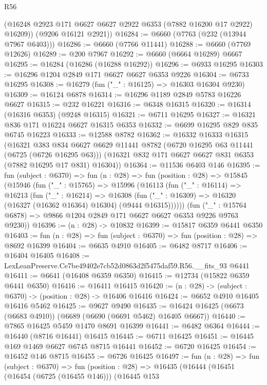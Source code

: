 \begin{lexlean}{R56}
\begin{coremodule}
        (@16248 @2923 @171 @6627 @6627 @2922 @6353 (@7882 @16200 @17 @2922) @16209))
      (@9206 @16121 @2921))
@16284 := @6660 (@7763 (@232 (@13944 @7967 @6403)))
@16286 := @6660 (@7766 @11441)
@16288 := @6660 (@7769 @12626)
@16289 := @200 @7967
@16292 := @6660 (@6664 @16289) @6667
@16295 := @16284 (@16286 (@16288 @16292))
@16296 := @6933 @16295
@16303 := @16296 @1204 @2849 @171 @6627 @6627 @6353 @9226
@16304 := @6733 @16295
@16308 := @16279 (fun ("_" : @16125) => @16303 @16304 @9230)
@16309 := @16124 @6878
@16314 := @16296 @1189 @2849 @5783 @16226 @6627
@16315 := @232 @16221
@16316 := @6348 @16315
@16320 := @16314 (@16316 @6353) (@9248 @16315)
@16321 := @6711 @16295
@16327 := @16321 @836 @171 @16224 @6627 @16315 @6353
@16332 := @6699 @16295 @829 @835 @6745 @16223
@16333 := @12588 @8782
@16362 := @16332
    @16333
    @16315
    (@16321
      @383
      @834
      @6627
      @6629
      @11441
      @8782
      (@6720 @16295 @63 @11441 (@6725 (@6726 @16295 @63)))
      (@16321 @832 @171 @6627 @6627 @831 @6353 (@7882 @16295 @17 @831) @16304))
@16364 := @11536 @6403 @146
@16395 := fun (subject : @6370) =>
  fun (n : @28) =>
  fun (position : @28) =>
  @15845
    (@15946
      (fun ("_" : @15765) =>
      @15996
        (@16113
          (fun ("_" : @16114) =>
          @16213
            (fun ("_" : @16214) =>
            @16308 (fun ("_" : @16309) => @16320 (@16327 (@16362 @16364) @16304) (@9444 @16315))))))
      (fun ("_" : @15764 @6878) => @9866 @1204 @2849 @171 @6627 @6627 @6353 @9226 @9763 @9230))
@16396 := (n : @28) -> @10832
@16399 := @15817 @6359 @6441 @6350
@16403 := fun (n : @28) => fun (subject : @6370) => fun (position : @28) => @8692 @16399
@16404 := @6635 @4910
@16405 := @6482 @8717
@16406 := @16404 @16405
@16408 := LexLeanPreserve.Ce7be49402e7cb52d0863d2f5475daf59.R56.__fits_93 @6441
@16411 := @6641 (@16408 @6359 @6350)
@16415 := @12734 (@15822 @6359 @6441 @6350)
@16416 := @16411 @16415
@16420 := (n : @28) -> (subject : @6370) -> (position : @28) -> @16406 @16416
@16424 := @6652 @4910 @16405 @16416 @5462
@16425 := @9627 @9490
@16435 := @16424 @16425 (@6673 (@6683 @4910)) (@6689 (@6690 (@6691 @5462) @16405 @6667))
@16440 := @7865 @16425 @5459 @1470 @8691 @16399
@16441 := @6482 @6364
@16444 := @16440 (@8716 @16441) @16415
@16445 := @6711 @16425
@16451 := @16445 @169 @1469 @6627 @6745 @8715 @16441
@16452 := @6720 @16425
@16454 := @16452 @146 @8715
@16455 := @6726 @16425
@16497 := fun (n : @28) =>
  fun (subject : @6370) =>
  fun (position : @28) =>
  @16435
    (@16444
      (@16451
        (@16454 (@6725 (@16455 @146)))
        (@16445
          @153

\end{coremodule}
\end{lexlean}
